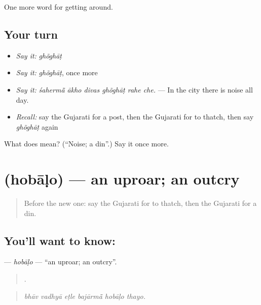 \begin{grammarlens}[title={What you've built}]
One more word for getting around.
\end{grammarlens}

\subsection*{Your turn}
\begin{itemize}
\raggedright
  \item \emph{Say it:} \emph{ghõghāṭ}
  \item \emph{Say it:} \emph{ghõghāṭ}, once more
  \item \emph{Say it:} \emph{śahermā̃ ākho divas ghõghāṭ rahe che.} — In the city there is noise all day.
  \item \emph{Recall:} say the Gujarati for a post, then the Gujarati for to thatch, then say \emph{ghõghāṭ} again
\end{itemize}

\begin{tcolorbox}[breakable,colback=teal!4,colframe=teal!35!black,title={Before you move on}]
What does  mean? (\textquotedblleft{}Noise; a din\textquotedblright{}.) Say it once more.
\end{tcolorbox}
\section[\texorpdfstring{\gu{હોબાળો} (hobāḷo)}{હોબાળો (hobāḷo)}]{ (hobāḷo) — an uproar; an outcry}

\label{lesson:GU-C421-hobalo}



\begin{quote}
Before the new one: say the Gujarati for to thatch, then the Gujarati for a din.
\end{quote}

\subsection*{You'll want to know: }
\textbf{} — \emph{hobāḷo} — \textquotedblleft{}an uproar; an outcry\textquotedblright{}.

\begin{quote}
     .
\end{quote}

\begin{quote}
\emph{bhāv vadhyā eṭle bajārmā̃ hobāḷo thayo.}
\end{quote}


